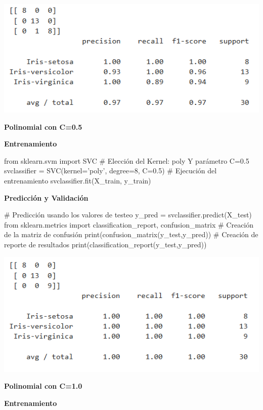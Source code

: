 \documentclass[paper=a4, fontsize=11pt]{scrartcl}
\numberwithin{equation}{section}		%
\numberwithin{figure}{section}			%
\numberwithin{table}{section}				%
\begin{document}
    \includegraphics[scale=0.8]{lineal_c_50}
    \newpage
    
    \textbf{Polinomial con C=0.5}
    
    \textbf{Entrenamiento}
    
    \begin{python}
    from sklearn.svm import SVC
    # Elección del Kernel: poly Y parámetro C=0.5
    svclassifier = SVC(kernel='poly', degree=8, C=0.5)
    # Ejecución del entrenamiento
    svclassifier.fit(X_train, y_train)
    \end{python}
    
    \textbf{Predicción y Validación}
    
    \begin{python}
    # Predicción usando los valores de testeo
    y_pred = svclassifier.predict(X_test)
    from sklearn.metrics import classification_report, confusion_matrix
    # Creación de la matriz de confusión
    print(confusion_matrix(y_test,y_pred))
    # Creación de reporte de resultados
    print(classification_report(y_test,y_pred))
    \end{python}
    
    \includegraphics[scale=0.8]{polynomial_c_05}
    \newpage
    
    \textbf{Polinomial con C=1.0}
    
    \textbf{Entrenamiento}
    
\end{document}
